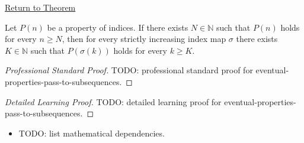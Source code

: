 \newpage
{}
\label{prf:eventual-properties-pass-to-subsequences}

\begin{remark*}[Return]
\hyperref[thm:eventual-properties-pass-to-subsequences]{Return to Theorem}
\end{remark*}

\begin{theorem*}
Let $P(n)$ be a property of indices. If there exists $N\in\mathbb{N}$ such
that $P(n)$ holds for every $n\ge N$, then for every strictly increasing
index map $\sigma$ there exists $K\in\mathbb{N}$ such that $P(\sigma(k))$
holds for every $k\ge K$.

\smallskip
\noindent
\end{theorem*}

\begin{proof}[Professional Standard Proof]
\LRAProofBodyStart
TODO: professional standard proof for eventual-properties-pass-to-subsequences.
\end{proof}

\begin{proof}[Detailed Learning Proof]
\LRAProofBodyStart
TODO: detailed learning proof for eventual-properties-pass-to-subsequences.
\end{proof}

\begin{remark*}
\end{remark*}

\begin{dependencies}
\begin{itemize}
  \item TODO: list mathematical dependencies.
\end{itemize}
\end{dependencies}

\clearpage
